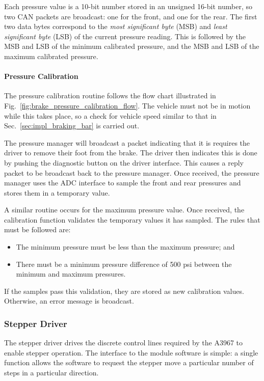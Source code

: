 Each pressure value is a 10-bit number stored in an unsigned 16-bit number, so two CAN packets are broadcast: one for the front, and one for the rear. The first two data bytes correspond to the \emph{most significant byte} (MSB) and \emph{least significant byte} (LSB) of the current pressure reading. This is followed by the MSB and LSB of the minimum calibrated pressure, and the MSB and LSB of the maximum calibrated pressure.

\paragraph{Pressure Calibration}

The pressure calibration routine follows the flow chart illustrated in Fig.\ \ref{fig:brake_pressure_calibration_flow}. The vehicle must not be in motion while this takes place, so a check for vehicle speed similar to that in Sec.\ \ref{sec:impl_braking_bar} is carried out. 

The pressure manager will broadcast a packet indicating that it is requires the driver to remove their foot from the brake. The driver then indicates this is done by pushing the diagnostic button on the driver interface. This causes a reply packet to be broadcast back to the pressure manager. Once received, the pressure manager uses the ADC interface to sample the front and rear pressures and stores them in a temporary value.

A similar routine occurs for the maximum pressure value. Once received, the calibration function validates the temporary values it has sampled. The rules that must be followed are:

\begin{itemize}
\item The minimum pressure must be less than the maximum pressure; and
\item There must be a minimum pressure difference of 500 psi between the minimum and maximum pressures.
\end{itemize}

If the samples pass this validation, they are stored as new calibration values. Otherwise, an error message is broadcast.

\subsubsection{Stepper Driver}

The stepper driver drives the discrete control lines required by the A3967 to enable stepper operation. The interface to the module software is simple: a single function allows the software to request the stepper move a particular number of steps in a particular direction.

